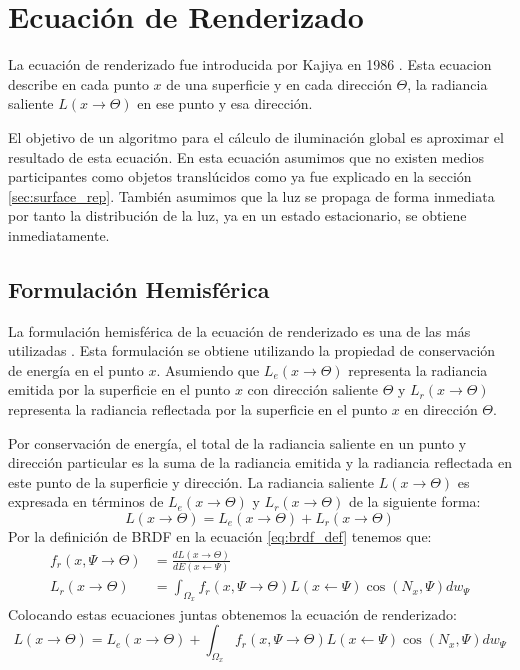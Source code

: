 \section{Ecuación de Renderizado}
La ecuación de renderizado fue introducida por Kajiya  en 1986 \cite{kajiya86}. Esta ecuacion describe en cada punto $x$ de una superficie y en cada dirección $\Theta$, la radiancia saliente $L(x\to\Theta)$ en ese punto y esa dirección.

El objetivo de un algoritmo para el cálculo de iluminación global es aproximar el resultado de esta ecuación. En esta ecuación asumimos que no existen medios participantes como objetos translúcidos como ya fue explicado en la sección \ref{sec:surface_rep}. También asumimos que la luz se propaga de forma inmediata por tanto la distribución de la luz, ya en un estado estacionario, se obtiene inmediatamente. 

\subsection{Formulación Hemisférica}
La formulación hemisférica de la ecuación de renderizado es una de las más utilizadas \cite{advanced_gi2006}. Esta formulación se obtiene utilizando la propiedad de conservación de energía en el punto $x$. Asumiendo que $L_{e}(x\to\Theta)$ representa la radiancia emitida por la superficie en el punto $x$ con dirección saliente $\Theta$ y $L_{r}(x\to\Theta)$ representa la radiancia reflectada por la superficie en el punto $x$ en dirección $\Theta$.

Por conservación de energía, el total de la radiancia saliente en un punto y dirección particular es la suma de la radiancia emitida y la radiancia reflectada en este punto de la superficie y dirección. La radiancia saliente $L(x\to\Theta)$ es expresada en términos de $L_{e}(x\to\Theta)$ y $L_{r}(x\to\Theta)$ de la siguiente forma:
\begin{equation}
    L(x\to\Theta) = L_{e}(x\to\Theta) + L_{r}(x\to\Theta)
    \label{eq:reflectance}
\end{equation}
Por la definición de \ac{BRDF} en la ecuación \ref{eq:brdf_def} tenemos que:
\begin{equation}
	\begin{split}
        f_{r}(x, \Psi\to\Theta) &= \frac{dL(x\to\Theta)}{dE(x\gets\Psi)}\\
        L_{r}(x\to\Theta) &= \int_{\Omega_{x}}{f_{r}(x, \Psi\to\Theta)L(x\gets\Psi)\cos(N_{x}, \Psi)dw_{\Psi}}
	\end{split}
	\label{eq:rendering_eq_LR}
\end{equation}
Colocando estas ecuaciones juntas obtenemos la ecuación de renderizado:
\begin{equation}
    L(x\to\Theta) = L_{e}(x\to\Theta) + \int_{\Omega_{x}}{f_{r}(x, \Psi\to\Theta)L(x\gets\Psi)\cos(N_{x}, \Psi)dw_{\Psi}}
    \label{eq:rendering_eq}
\end{equation}

